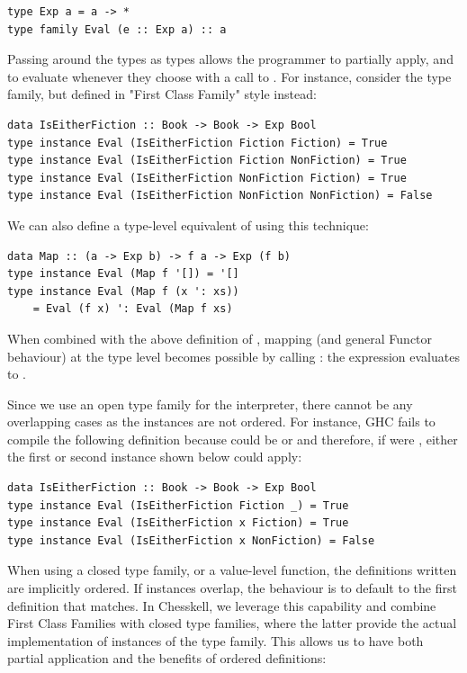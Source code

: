 \begin{lstlisting}
type Exp a = a -> *
type family Eval (e :: Exp a) :: a
\end{lstlisting}

Passing around the types as  types allows the programmer to partially apply, and to evaluate whenever they choose with a call to . For instance, consider the  type family, but defined in "First Class Family" style instead:

\begin{lstlisting}
data IsEitherFiction :: Book -> Book -> Exp Bool
type instance Eval (IsEitherFiction Fiction Fiction) = True
type instance Eval (IsEitherFiction Fiction NonFiction) = True
type instance Eval (IsEitherFiction NonFiction Fiction) = True
type instance Eval (IsEitherFiction NonFiction NonFiction) = False
\end{lstlisting}

We can also define a type-level equivalent of  using this technique:

\begin{lstlisting}
data Map :: (a -> Exp b) -> f a -> Exp (f b)
type instance Eval (Map f '[]) = '[]
type instance Eval (Map f (x ': xs))
    = Eval (f x) ': Eval (Map f xs)
\end{lstlisting}

When combined with the above definition of , mapping (and general Functor behaviour) at the type level becomes possible by calling : the expression  evaluates to .

Since we use an open type family for the interpreter, there cannot be any overlapping cases as the instances are not ordered. For instance, GHC fails to compile the following definition because  could be  or  and therefore, if  were , either the first or second instance shown below could apply:

\begin{lstlisting}
data IsEitherFiction :: Book -> Book -> Exp Bool
type instance Eval (IsEitherFiction Fiction _) = True
type instance Eval (IsEitherFiction x Fiction) = True
type instance Eval (IsEitherFiction x NonFiction) = False
\end{lstlisting}

When using a closed type family, or a value-level function, the definitions written are implicitly ordered. If instances overlap, the behaviour is to default to the first definition that matches. In Chesskell, we leverage this capability and combine First Class Families with closed type families, where the latter provide the actual implementation of instances of the  type family. This allows us to have both partial application and the benefits of ordered definitions:

